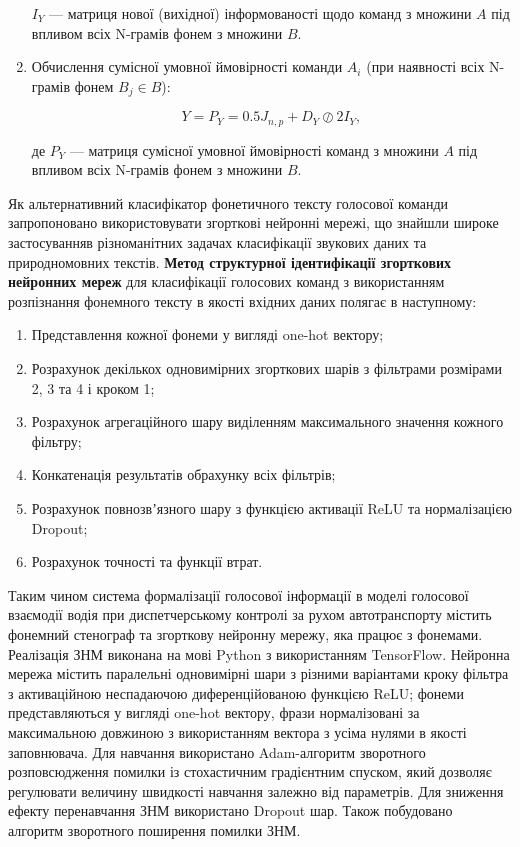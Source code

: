 \begin{enumerate}
	$I_Y$ --- матриця нової (вихідної) інформованості щодо команд з множини $A$ під впливом всіх N-грамів фонем з множини $B$.
	
	\item Обчислення сумісної умовної ймовірності команди $A_i$ (при наявності всіх N-грамів фонем $B_j \in B$):
	
	\[
	Y=P_Y=0.5J_{n,p}+D_Y \oslash 2I_Y,
	\]
	
	де $P_Y$ --- матриця сумісної умовної ймовірності команд з множини $A$ під впливом всіх N-грамів фонем з множини $B$.
\end{enumerate}
	
Як альтернативний класифікатор фонетичного тексту голосової команди запропоновано використовувати згорткові нейронні мережі, що знайшли широке застосуванняв різноманітних задачах класифікації звукових даних та природномовних текстів. \textbf{Метод структурної ідентифікації згорткових нейронних мереж} для класифікації голосових команд з використанням розпізнання фонемного тексту в якості вхідних даних полягає в наступному:

\begin{enumerate}
	\item Представлення кожної фонеми у вигляді one-hot вектору;
	\item Розрахунок декількох одновимірних згорткових шарів з фільтрами розмірами 2, 3 та 4 і кроком 1;
	\item Розрахунок агрегаційного шару виділенням максимального значення кожного фільтру;
	\item Конкатенація результатів обрахунку всіх фільтрів;
	\item Розрахунок повнозвʼязного шару з функцією активації ReLU та нормалізацією Dropout;
	\item Розрахунок точності та функції втрат.
\end{enumerate}

Таким чином система формалізації голосової інформації в моделі голосової взаємодії водія при диспетчерському контролі за рухом автотранспорту містить фонемний стенограф та згорткову нейронну мережу, яка працює з фонемами. Реалізація ЗНМ виконана на мові Python з використанням TensorFlow. Нейронна мережа містить паралельні одновимірні шари з різними варіантами кроку фільтра з активаційною неспадаючою диференційованою функцією ReLU; фонеми представляються у вигляді one-hot вектору, фрази нормалізовані за максимальною довжиною з використанням вектора з усіма нулями в якості заповнювача. Для навчання використано Adam-алгоритм зворотного розповсюдження помилки із стохастичним градієнтним спуском, який дозволяє регулювати величину швидкості навчання залежно від параметрів. Для зниження ефекту перенавчання ЗНМ використано Dropout шар. Також побудовано алгоритм зворотного поширення помилки ЗНМ.

